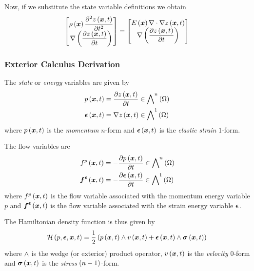 Now, if we substitute the state variable definitions we obtain
\begin{equation}
  \begin{bmatrix}
    \fnof{\rho}{\vectr{x}}\deltwosqby{\fnof{z}{\vectr{x},t}}{t} \\
    \gradient{}{\pbrac{\delby{\fnof{z}{\vectr{x},t}}{t}}}    
  \end{bmatrix}=\begin{bmatrix}
    \fnof{E}{\vectr{x}}\divergence{}{\gradient{}{\fnof{z}{\vectr{x},t}}} \\
    \gradient{}{\pbrac{\delby{\fnof{z}{\vectr{x},t}}{t}}}
  \end{bmatrix}
\end{equation}

\subsubsection{Exterior Calculus Derivation}

The \emph{state} or \emph{energy} variables are given by
\begin{align}
    \fnof{p}{\vectr{x},t}&=\delby{\fnof{z}{\vectr{x},t}}{t}\in\diffformspace{n}{\Omega} \\
    \fnof{\vectr{\epsilon}}{\vectr{x},t}&=\gradient{}{\fnof{z}{\vectr{x},t}}\in\diffformspace{1}{\Omega}
\end{align}
where $ p\left(  \boldsymbol{x} ,t \right) $ is the \emph{momentum} $n$-form and
$  \boldsymbol{\epsilon} \left(  \boldsymbol{x} ,t \right) $ is the \emph{elastic
strain} $1$-form.

The flow variables are 
\begin{align}
  \fnof{f^{p}}{\vectr{x},t}&=-\delby{\fnof{p}{\vectr{x},t}}{t}\in\diffformspace{n}{\Omega} \\
  \fnof{\vectr{f}^{\vectr{\epsilon}}}{\vectr{x},t}&=-\delby{\fnof{\vectr{\epsilon}}{\vectr{x},t}}{t}\in\diffformspace{1}{\Omega}
\end{align}
where $ f^{p}\left(  \boldsymbol{x} ,t \right) $ is the flow variable associated with the momentum energy variable $p$ and $  \boldsymbol{f} ^{ \boldsymbol{\epsilon} }\left(  \boldsymbol{x} ,t \right) $ is the flow variable associated with the strain energy variable $ \boldsymbol{\epsilon} $.

The Hamiltonian density function is thus given by
\begin{equation}
     \mathcal{H} \left( p, \boldsymbol{\epsilon} , \boldsymbol{x} ,t \right)  =\dfrac{1}{2}\left(   p\left(  \boldsymbol{x} ,t \right)  \wedge  v\left(  \boldsymbol{x} ,t \right)  +   \boldsymbol{\epsilon} \left(  \boldsymbol{x} ,t \right)  \wedge   \boldsymbol{\sigma} \left(  \boldsymbol{x} ,t \right)   \right)
\end{equation}
where $ \wedge $ is the wedge (or exterior) product operator,
$ v\left(  \boldsymbol{x} ,t \right) $ is the \emph{velocity} $0$-form and
$  \boldsymbol{\sigma} \left(  \boldsymbol{x} ,t \right) $ is the \emph{stress}
$\left( n-1 \right)$-form.

